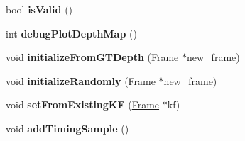 \begin{DoxyCompactItemize}
\item 
\hypertarget{classlsd__slam_1_1_depth_map_a77ffa8175ac0ff7e3d9a6bbe72d7fe93}{bool {\bfseries is\-Valid} ()}\label{classlsd__slam_1_1_depth_map_a77ffa8175ac0ff7e3d9a6bbe72d7fe93}

\item 
\hypertarget{classlsd__slam_1_1_depth_map_a30565f7b2f6fddff49694a05ddac983d}{int {\bfseries debug\-Plot\-Depth\-Map} ()}\label{classlsd__slam_1_1_depth_map_a30565f7b2f6fddff49694a05ddac983d}

\item 
\hypertarget{classlsd__slam_1_1_depth_map_aef0161396bb13077d05198f0f5514e4c}{void {\bfseries initialize\-From\-G\-T\-Depth} (\hyperlink{classlsd__slam_1_1_frame}{Frame} $\ast$new\-\_\-frame)}\label{classlsd__slam_1_1_depth_map_aef0161396bb13077d05198f0f5514e4c}

\item 
\hypertarget{classlsd__slam_1_1_depth_map_ad43f276ef4edee8420460b452929aad4}{void {\bfseries initialize\-Randomly} (\hyperlink{classlsd__slam_1_1_frame}{Frame} $\ast$new\-\_\-frame)}\label{classlsd__slam_1_1_depth_map_ad43f276ef4edee8420460b452929aad4}

\item 
\hypertarget{classlsd__slam_1_1_depth_map_a79d83f1d1911274ab55d95ebf5e3dab5}{void {\bfseries set\-From\-Existing\-K\-F} (\hyperlink{classlsd__slam_1_1_frame}{Frame} $\ast$kf)}\label{classlsd__slam_1_1_depth_map_a79d83f1d1911274ab55d95ebf5e3dab5}

\item 
\hypertarget{classlsd__slam_1_1_depth_map_aaad7df1f66aea8294bfddd8bc929bc00}{void {\bfseries add\-Timing\-Sample} ()}\label{classlsd__slam_1_1_depth_map_aaad7df1f66aea8294bfddd8bc929bc00}

\end{DoxyCompactItemize}
